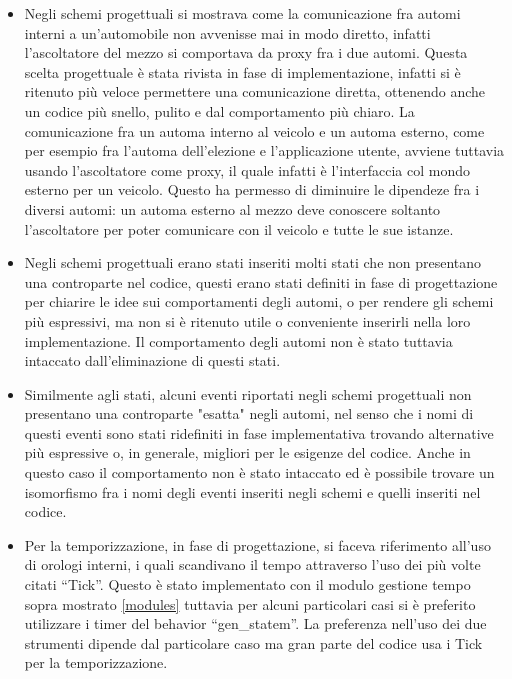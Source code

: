 \begin{itemize}
	\item Negli schemi progettuali si mostrava come la comunicazione fra automi interni a un'automobile non avvenisse mai in modo diretto, infatti l'ascoltatore del mezzo si comportava da proxy fra i due automi. Questa scelta progettuale è stata rivista in fase di implementazione, infatti si è ritenuto più veloce permettere una comunicazione diretta, ottenendo anche un codice più snello, pulito e dal comportamento più chiaro. 
	La comunicazione fra un automa interno al veicolo e un automa esterno, come per esempio fra l'automa dell'elezione e l'applicazione utente, avviene tuttavia usando l'ascoltatore come proxy, il quale infatti è l'interfaccia col mondo esterno per un veicolo. Questo ha permesso di diminuire le dipendeze fra i diversi automi: un automa esterno al mezzo deve conoscere soltanto l'ascoltatore per poter comunicare con il veicolo e tutte le sue istanze.
	\item Negli schemi progettuali erano stati inseriti molti stati che non presentano una controparte nel codice, questi erano stati definiti in fase di progettazione per chiarire le idee sui comportamenti degli automi, o per rendere gli schemi più espressivi, ma non si è ritenuto utile o conveniente inserirli nella loro implementazione. Il comportamento degli automi non è stato tuttavia intaccato dall'eliminazione di questi stati. 
	\item Similmente agli stati, alcuni eventi riportati negli schemi progettuali non presentano una controparte "esatta" negli automi, nel senso che i nomi di questi eventi sono stati ridefiniti in fase implementativa trovando alternative più espressive o, in generale, migliori per le esigenze del codice. Anche in questo caso il comportamento non è stato intaccato ed è possibile trovare un isomorfismo fra i nomi degli eventi inseriti negli schemi e quelli inseriti nel codice.
	\item Per la temporizzazione, in fase di progettazione, si faceva riferimento all'uso di orologi interni, i quali scandivano il tempo attraverso l'uso dei più volte citati ``Tick''. Questo è stato implementato con il modulo gestione tempo sopra mostrato \ref{modules} tuttavia per alcuni particolari casi si è preferito utilizzare i timer del behavior ``gen\_statem''. La preferenza nell'uso dei due strumenti dipende dal particolare caso ma gran parte del codice usa i Tick per la temporizzazione.
\end{itemize}

